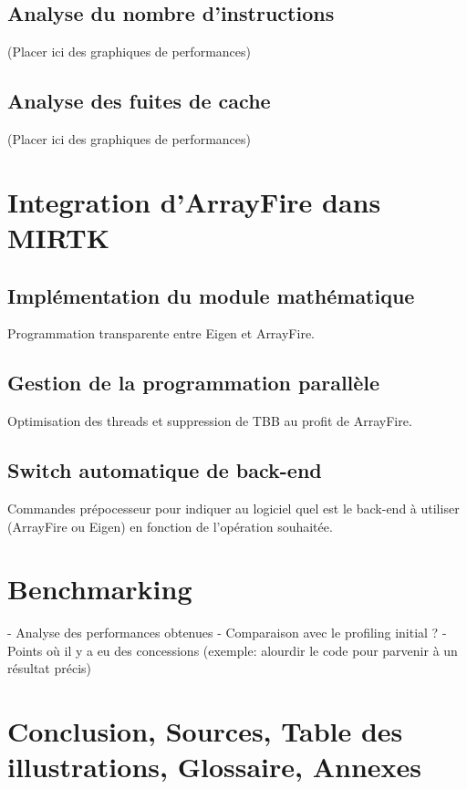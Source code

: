 \documentclass[12pt]{report}
\begin{document}
	\subsection{Analyse du nombre d'instructions}
	
	(Placer ici des graphiques de performances)
	\subsection{Analyse des fuites de cache}
	
	(Placer ici des graphiques de performances)
	
	\section{Integration d'ArrayFire dans MIRTK}
	\subsection{Implémentation du module mathématique}
	Programmation transparente entre Eigen et ArrayFire.
	\subsection{Gestion de la programmation parallèle}
	Optimisation des threads et suppression de TBB au profit de ArrayFire.
	\subsection{Switch automatique de back-end}
	Commandes prépocesseur pour indiquer au logiciel quel est le back-end à utiliser (ArrayFire ou Eigen) en fonction de l'opération souhaitée.
	\section{Benchmarking}
	- Analyse des performances obtenues \newline
	- Comparaison avec le profiling initial ? \newline
	- Points où il y a eu des concessions (exemple: alourdir le code pour parvenir à un résultat précis)
\section*{Conclusion, Sources, Table des illustrations, Glossaire, Annexes} %
	
\end{document}
